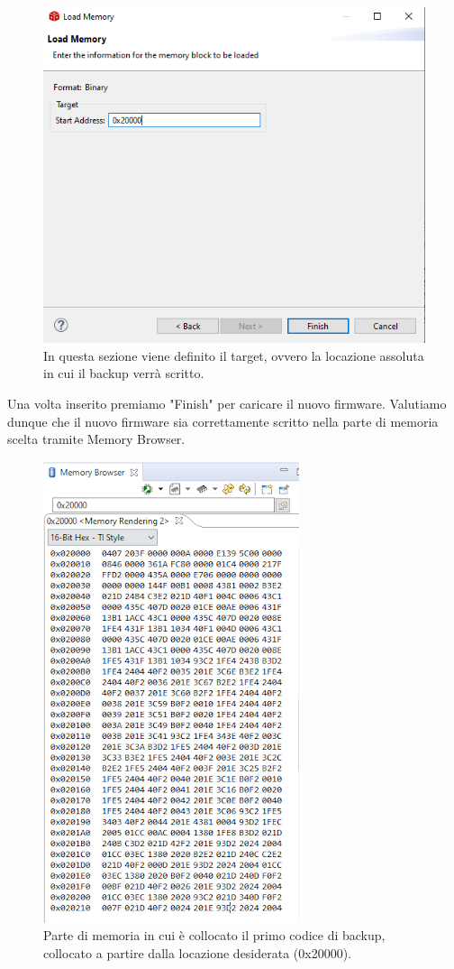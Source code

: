 \documentclass[LaM,binding=0.6cm]{../sapthesis}
\begin{document}
\begin{figure}[htbp]
\centerline{\includegraphics[scale=0.75]{examples/LoadMemory2.PNG}}
\caption{In questa sezione viene definito il target, ovvero la locazione assoluta in cui il backup verrà scritto.}
\label{fig}
\end{figure}
\newline


Una volta inserito premiamo "Finish" per caricare il nuovo firmware.
\clearpage
Valutiamo dunque che il nuovo firmware sia correttamente scritto nella parte di memoria scelta tramite Memory Browser.


\begin{figure}[htbp]
\centerline{\includegraphics[scale=0.75]{examples/LoadedMemory.png}}
\caption{Parte di memoria in cui è collocato il primo codice di backup, collocato a partire dalla locazione desiderata (0x20000).}
\label{fig}
\end{figure}
\newline
\end{document}

